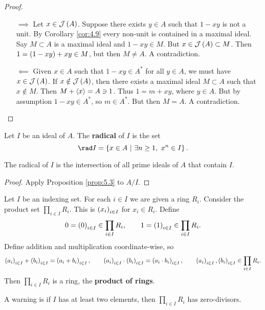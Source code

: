 \begin{proof}
\hfill
\begin{itemize}
\item[$ \implies $] Let $ x \in \JJJ\br{A} $. Suppose there exists $ y \in A $ such that $ 1 - xy $ is not a unit. By Corollary \ref{cor:4.9} every non-unit is contained in a maximal ideal. Say $ M \subset A $ is a maximal ideal and $ 1 - xy \in M $. But $ x \in \JJJ\br{A} \subset M $. Then $ 1 = \br{1 - xy} + xy \in M $, but then $ M \ne A $. A contradiction.
\item[$ \impliedby $] Given $ x \in A $ such that $ 1 - xy \in A^* $ for all $ y \in A $, we must have $ x \in \JJJ\br{A} $. If $ x \notin \JJJ\br{A} $, then there exists a maximal ideal $ M \subset A $ such that $ x \notin M $. Then $ M + \left\langle x \right\rangle = A \ni 1 $. Thus $ 1 = m + xy $, where $ y \in A $. But by assumption $ 1 - xy \in A^* $, so $ m \in A^* $. But then $ M = A $. A contradiction.
\end{itemize}
\end{proof}

Let $ I $ be an ideal of $ A $. The \textbf{radical} of $ I $ is the set
$$ \rad I = \cbr{x \in A \st \exists n \ge 1, \ x^n \in I}. $$

\begin{proposition}
The radical of $ I $ is the intersection of all prime ideals of $ A $ that contain $ I $.
\end{proposition}

\begin{proof}
Apply Proposition \ref{prop:5.3} to $ A / I $.
\end{proof}


\begin{definition}
Let $ I $ be an indexing set. For each $ i \in I $ we are given a ring $ R_i $. Consider the product set $ \prod_{i \in I} R_i $. This is $ \br{x_i}_{i \in I} $ for $ x_i \in R_i $. Define
$$ 0 = \br{0}_{i \in I} \in \prod_{i \in I} R_i, \qquad 1 = \br{1}_{i \in I} \in \prod_{i \in I} R_i. $$
Define addition and multiplication coordinate-wise, so
$$ \br{a_i}_{i \in I} + \br{b_i}_{i \in I} = \br{a_i + b_i}_{i \in I}, \qquad \br{a_i}_{i \in I} \cdot \br{b_i}_{i \in I} = \br{a_i \cdot b_i}_{i \in I}, \qquad \br{a_i}_{i \in I}, \br{b_i}_{i \in I} \in \prod_{i \in I} R_i. $$
Then $ \prod_{i \in I} R_i $ is a ring, the \textbf{product of rings}.
\end{definition}

A warning is if $ I $ has at least two elements, then $ \prod_{i \in I} R_i $ has zero-divisors.

